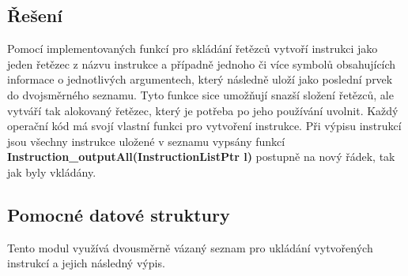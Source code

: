 \documentclass[a4paper,11pt]{article}
\begin{document}
\subsection{Řešení} \label{gen-reseni}
Pomocí implementovaných funkcí pro skládání řetězců vytvoří instrukci jako jeden řetězec z názvu instrukce a případně jednoho či více symbolů obsahujících informace o jednotlivých argumentech, který následně uloží jako poslední prvek do dvojsměrného seznamu. Tyto funkce sice umožňují snazší složení řetězců, ale vytváří tak alokovaný řetězec, který je potřeba po jeho používání uvolnit. Každý operační kód má svojí vlastní funkci pro vytvoření instrukce. Při výpisu instrukcí jsou všechny instrukce uložené v seznamu vypsány funkcí \textbf{Instruction\_outputAll(InstructionListPtr l)} postupně na nový řádek, tak jak byly vkládány.

\subsection{Pomocné datové struktury} \label{gen-struktury}
Tento modul využívá dvousměrně vázaný seznam pro ukládání vytvořených instrukcí a jejich následný výpis.

	
\end{document}
